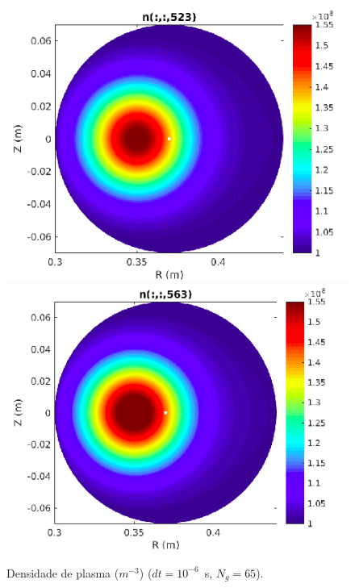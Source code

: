 \documentclass[12pt,oneside,a4paper]{abntex2}
\begin{document}
\begin{figure}[H]
\includegraphics[scale=0.4]{../SImulacao_breakdown/Adaptacao_nova/explicito/n523.png} 
\includegraphics[scale=0.4]{../SImulacao_breakdown/Adaptacao_nova/explicito/n563.png} 
\caption{Densidade de plasma ($m^{-3}$) ($dt=10^{-6}$\ s, $N_g = 65$).}
\label{n3}
\end{figure}
\end{document}
